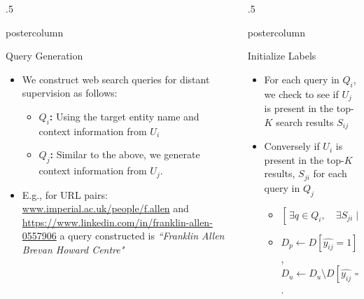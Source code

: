 \documentclass{beamer}
\newlength{\columnheight}
\begin{document}
\begin{frame}
\begin{columns}
\begin{column}{.5\textwidth}
\begin{beamercolorbox}[center]{postercolumn}
\begin{minipage}{.98\textwidth}
{         \begin{block}{Query Generation}
\begin{itemize}
\item We construct web search queries for distant supervision as follows:
\begin{itemize}
\item \textbf{$Q_i$:} Using the target entity name and context information from $U_{i}$
\item \textbf{$Q_j$:} Similar to the above, we generate context information from  $U_{j}$.
\end{itemize}
\item E.g., for URL pairs: {\color{blue} \small \url{www.imperial.ac.uk/people/f.allen}} and {\color{blue} \small \url{https://www.linkedin.com/in/franklin-allen-0557906}}
a query constructed is {\color{cyan} \small {\textit{``Franklin Allen Brevan Howard Centre"}}}
\end{itemize}
\vspace{0.5em}
\end{block} \vfill
		}\end{minipage}\end{beamercolorbox}
	\end{column}
	\begin{column}{.5\textwidth}
		\begin{beamercolorbox}[center]{postercolumn}
			\begin{minipage}{.98\textwidth} %
				\parbox[t][\columnheight]{\textwidth}{ %



\begin{block}{Initialize Labels}
\begin{itemize}
\item For each query in $Q_i$, we check to see if $U_{j}$ is present in the top-$K$ search results $S_{ij}$
	\vspace{0.5em}
\item Conversely if $U_i$ is present in the top-$K$ results, $S_{ji}$ for each query in $Q_j$
	\vspace{0.7em}
\begin{itemize}
\item $[ \, \exists  q \in Q_i,  \quad \exists S_{ji} \mid U_j \in S_{ji} \lor \exists q \in Q_j,  \quad \exists S_{ij} \mid U_i \in S_{ij} ] \, \implies \hat{y_{ij}}=1$
	\vspace{0.7em}
\item $D_{p} \gets D[\hat{y_{ij}}=1]$, $D_{u} \gets D_{u} \setminus D[\hat{y_{ij}}=1]$.
\end{itemize}
\end{itemize}
\vspace{0.5em}
\end{block}
\vfill

}
\end{minipage}
\end{beamercolorbox}
\end{column}
\end{columns}
\end{frame}
\end{document}
